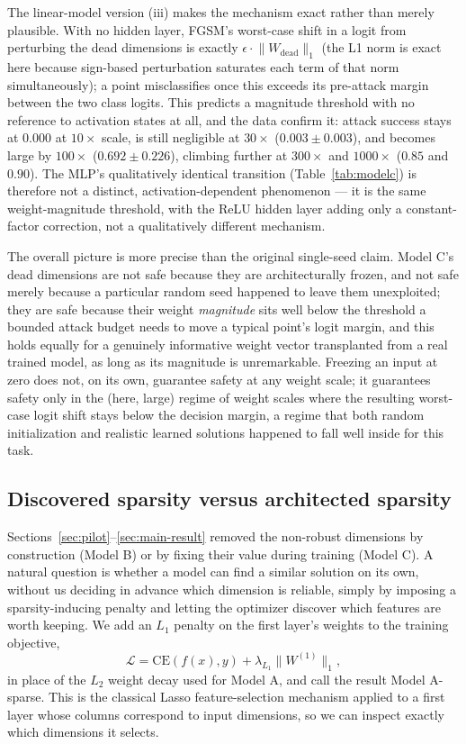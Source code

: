 \documentclass[11pt]{article}
\begin{document}
The linear-model version (iii) makes the mechanism exact rather than
merely plausible. With no hidden layer, FGSM's worst-case shift in a
logit from perturbing the dead dimensions is exactly $\epsilon \cdot
\lVert W_{\text{dead}} \rVert_1$ (the L1 norm is exact here because
sign-based perturbation saturates each term of that norm simultaneously);
a point misclassifies once this exceeds its pre-attack margin between the
two class logits. This predicts a magnitude threshold with no reference to
activation states at all, and the data confirm it: attack success stays
at $0.000$ at $10\times$ scale, is still negligible at $30\times$
($0.003\pm0.003$), and becomes large by $100\times$ ($0.692\pm0.226$),
climbing further at $300\times$ and $1000\times$ ($0.85$ and $0.90$).
The MLP's qualitatively identical transition (Table~\ref{tab:modelc}) is
therefore not a distinct, activation-dependent phenomenon --- it is the
same weight-magnitude threshold, with the ReLU hidden layer adding only a
constant-factor correction, not a qualitatively different mechanism.

The overall picture is more precise than the original single-seed claim.
Model C's dead dimensions are not safe because they are architecturally
frozen, and not safe merely because a particular random seed happened to
leave them unexploited; they are safe because their weight
\emph{magnitude} sits well below the threshold a bounded attack budget
needs to move a typical point's logit margin, and this holds equally for
a genuinely informative weight vector transplanted from a real trained
model, as long as its magnitude is unremarkable. Freezing an input at
zero does not, on its own, guarantee safety at any weight scale; it
guarantees safety only in the (here, large) regime of weight scales where
the resulting worst-case logit shift stays below the decision margin,
a regime that both random initialization and realistic learned solutions
happened to fall well inside for this task.

\subsection{Discovered sparsity versus architected sparsity}
\label{sec:sparsity}

Sections~\ref{sec:pilot}--\ref{sec:main-result} removed the non-robust
dimensions by construction (Model B) or by fixing their value during
training (Model C). A natural question is whether a model can find a
similar solution on its own, without us deciding in advance which
dimension is reliable, simply by imposing a sparsity-inducing penalty and
letting the optimizer discover which features are worth keeping. We add an
$L_1$ penalty on the first layer's weights to the training objective,
\[
\mathcal L = \mathrm{CE}(f(x), y) + \lambda_{L_1} \lVert W^{(1)} \rVert_1,
\]
in place of the $L_2$ weight decay used for Model A, and call the result
Model A-sparse. This is the classical Lasso feature-selection mechanism
\cite{tibshirani1996} applied to a first layer whose columns correspond to
input dimensions, so we can inspect exactly which dimensions it selects.
\end{document}
